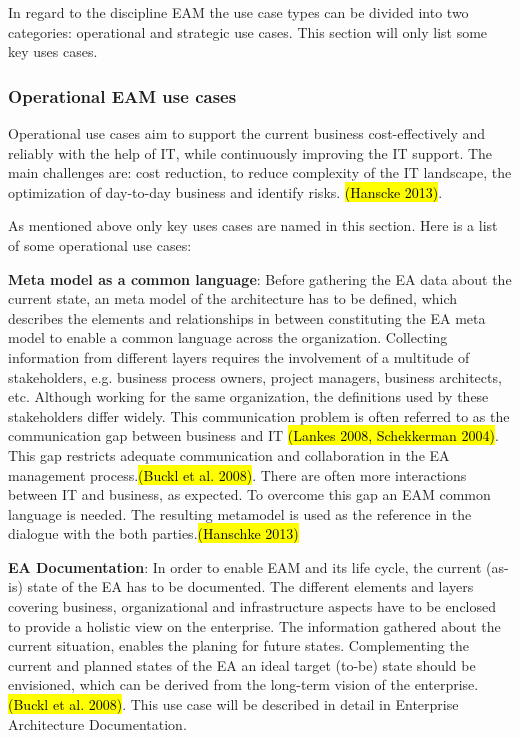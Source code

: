 
In regard to the discipline EAM the use case types can be divided into two categories: operational and strategic use cases. This section will only list some key uses cases.

\subsubsection{Operational EAM use cases}
Operational use cases aim to support the current business cost-effectively and reliably with the help of IT, while continuously improving the IT support. The main challenges are: cost reduction, to reduce complexity of the IT landscape, the optimization of day-to-day business and identify risks. \hl{(Hanscke 2013)}.

As mentioned above only key uses cases are named in this section. Here is a list of some operational use cases:

\textbf{Meta model as a common language}: Before gathering the EA data about the current state, an meta model of the architecture has to be defined, which describes the elements and relationships in between constituting the EA meta model to enable a common language across the organization. Collecting information from different layers requires the involvement of a multitude of stakeholders, e.g. business process owners, project managers, business architects, etc. Although working for the same organization, the definitions used by these stakeholders differ widely. This communication problem is often referred to as the communication gap between business and IT \hl{(Lankes 2008, Schekkerman 2004)}. This gap restricts adequate communication and collaboration in the EA management process.\hl{(Buckl et al. 2008)}. There are often more interactions between IT and business, as expected. To overcome this gap an EAM common language is needed. The resulting metamodel is used as the reference in the dialogue with the both parties.\hl{(Hanschke 2013)}

\textbf{EA Documentation}: In order to enable EAM and its life cycle, the current (as- is) state of the EA has to be documented. The different elements and layers covering business, organizational and infrastructure aspects have to be enclosed to provide a holistic view on the enterprise. The information gathered about the current situation, enables the planing for future states. Complementing the current and planned states of the EA an ideal target (to-be) state should be envisioned, which can be derived from the long-term vision of the enterprise. \hl{(Buckl et al. 2008)}. This use case will be described in detail in \subsectionautorefname{} Enterprise Architecture Documentation.

